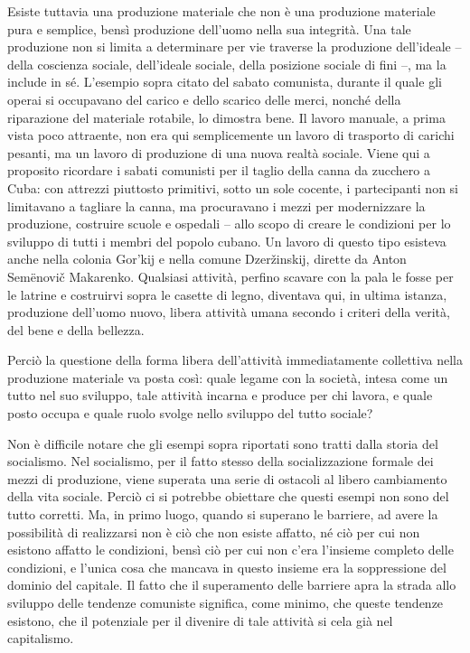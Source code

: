\documentclass[12pt,a4paper,openany]{book}
\begin{document}
Esiste tuttavia una produzione materiale che non è una produzione materiale pura e semplice, bensì produzione dell'uomo nella sua integrità. Una tale produzione non si limita a determinare per vie traverse la produzione dell'ideale – della coscienza sociale, dell'ideale sociale, della posizione sociale di fini –, ma la include in sé. L'esempio sopra citato del sabato comunista, durante il quale gli operai si occupavano del carico e dello scarico delle merci, nonché della riparazione del materiale rotabile, lo dimostra bene. Il lavoro manuale, a prima vista poco attraente, non era qui semplicemente un lavoro di trasporto di carichi pesanti, ma un lavoro di produzione di una nuova realtà sociale. Viene qui a proposito ricordare i sabati comunisti per il taglio della canna da zucchero a Cuba: con attrezzi piuttosto primitivi, sotto un sole cocente, i partecipanti non si limitavano a tagliare la canna, ma procuravano i mezzi per modernizzare la produzione, costruire scuole e ospedali – allo scopo di creare le condizioni per lo sviluppo di tutti i membri del popolo cubano. Un lavoro di questo tipo esisteva anche nella colonia Gor'kij e nella comune Dzeržinskij, dirette da Anton Semënovič Makarenko. Qualsiasi attività, perfino scavare con la pala le fosse per le latrine e costruirvi sopra le casette di legno, diventava qui, in ultima istanza, produzione dell'uomo nuovo, libera attività umana secondo i criteri della verità, del bene e della bellezza.

Perciò la questione della forma libera dell'attività immediatamente collettiva nella produzione materiale va posta così: quale legame con la società, intesa come un tutto nel suo sviluppo, tale attività incarna e produce per chi lavora, e quale posto occupa e quale ruolo svolge nello sviluppo del tutto sociale?

Non è difficile notare che gli esempi sopra riportati sono tratti dalla storia del socialismo. Nel socialismo, per il fatto stesso della socializzazione formale dei mezzi di produzione, viene superata una serie di ostacoli al libero cambiamento della vita sociale. Perciò ci si potrebbe obiettare che questi esempi non sono del tutto corretti. Ma, in primo luogo, quando si superano le barriere, ad avere la possibilità di realizzarsi non è ciò che non esiste affatto, né ciò per cui non esistono affatto le condizioni, bensì ciò per cui non c'era l'insieme completo delle condizioni, e l'unica cosa che mancava in questo insieme era la soppressione del dominio del capitale. Il fatto che il superamento delle barriere apra la strada allo sviluppo delle tendenze comuniste significa, come minimo, che queste tendenze esistono, che il potenziale per il divenire di tale attività si cela già nel capitalismo.
\end{document}
